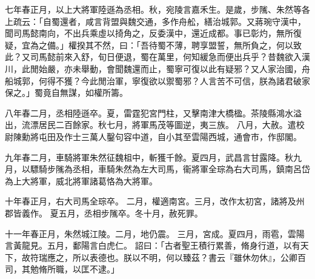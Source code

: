 \begin{pinyinscope}
 
七年春正月，以上大將軍陸遜為丞相。秋，宛陵言嘉禾生。是歲，步隲、朱然等各上疏云：「自蜀還者，咸言背盟與魏交通，多作舟舩，繕治城郭。又蔣琬守漢中，聞司馬懿南向，不出兵乘虛以掎角之，反委漢中，還近成都。事已彰灼，無所復疑，宜為之備。」權揆其不然，曰：「吾待蜀不薄，聘享盟誓，無所負之，何以致此？又司馬懿前來入舒，旬日便退，蜀在萬里，何知緩急而便出兵乎？昔魏欲入漢川，此閒始嚴，亦未舉動，會聞魏還而止，蜀寧可復以此有疑邪？又人家治國，舟船城郭，何得不獲？今此閒治軍，寧復欲以禦蜀邪？人言苦不可信，朕為諸君破家保之。」蜀竟自無謀，如權所籌。
 
 
八年春二月，丞相陸遜卒。夏，雷霆犯宮門柱，又擊南津大橋楹。茶陵縣鴻水溢出，流漂居民二百餘家。秋七月，將軍馬茂等圖逆，夷三族。
 八月，大赦。遣校尉陳勳將屯田及作士三萬人鑿句容中道，自小其至雲陽西城，通會巿，作邸閣。
 
 
九年春二月，車騎將軍朱然征魏柤中，斬獲千餘。夏四月，武昌言甘露降。秋九月，以驃騎步隲為丞相，車騎朱然為左大司馬，衞將軍全琮為右大司馬，鎮南呂岱為上大將軍，威北將軍諸葛恪為大將軍。
 
 
十年春正月，右大司馬全琮卒。
 二月，權適南宮。三月，改作太初宮，諸將及州郡皆義作。
 夏五月，丞相步隲卒。冬十月，赦死罪。
 
 
十一年春正月，朱然城江陵。二月，地仍震。
 三月，宮成。夏四月，雨雹，雲陽言黃龍見。五月，鄱陽言白虎仁。
 詔曰：「古者聖王積行累善，脩身行道，以有天下，故符瑞應之，所以表德也。朕以不明，何以臻茲？書云『雖休勿休』，公卿百司，其勉脩所職，以匡不逮。」
 

\end{pinyinscope}
